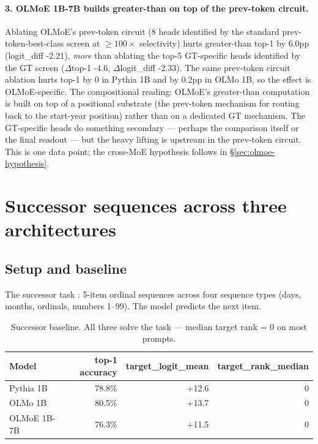\documentclass[11pt]{article}
\begin{document}
\paragraph{3. OLMoE 1B-7B builds greater-than on top of the prev-token circuit.}
Ablating OLMoE's prev-token circuit (8 heads identified by the standard prev-token-best-class screen at $\geq 100\times$ selectivity) hurts greater-than top-1 by 6.0pp (logit\_diff -2.21), \emph{more} than ablating the top-5 GT-specific heads identified by the GT screen ($\Delta$top-1 -4.6, $\Delta$logit\_diff -2.33). The same prev-token circuit ablation hurts top-1 by 0 in Pythia 1B and by 0.2pp in OLMo 1B, so the effect is OLMoE-specific. The compositional reading: OLMoE's greater-than computation is built on top of a positional substrate (the prev-token mechanism for routing back to the start-year position) rather than on a dedicated GT mechanism. The GT-specific heads do something secondary --- perhaps the comparison itself or the final readout --- but the heavy lifting is upstream in the prev-token circuit. This is one data point; the cross-MoE hypothesis follows in \S\ref{sec:olmoe-hypothesis}.

\section{Successor sequences across three architectures}
\label{sec:succ}

\subsection{Setup and baseline}

The successor task \citep{gould2023successor}: 5-item ordinal sequences across four sequence types (days, months, ordinals, numbers 1--99). The model predicts the next item.

\begin{table}[h]
\centering
\small
\begin{tabular}{lrrr}
\toprule
Model & top-1 accuracy & target\_logit\_mean & target\_rank\_median \\
\midrule
Pythia 1B & 78.8\% & +12.6 & 0 \\
OLMo 1B & 80.5\% & +13.7 & 0 \\
OLMoE 1B-7B & 76.3\% & +11.5 & 0 \\
\bottomrule
\end{tabular}
\caption{Successor baseline. All three solve the task --- median target rank = 0 on most prompts.}
\label{tab:succ-baseline}
\end{table}
\end{document}
